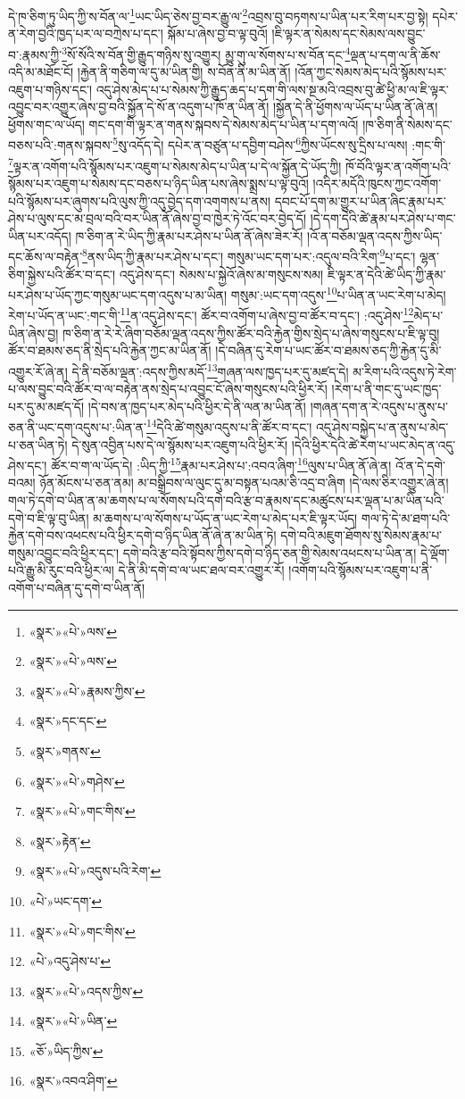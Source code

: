 དེ་ཁ་ཅིག་ཏུ་ཡིད་ཀྱི་ས་བོན་ལ་\footnote{«སྣར་»«པེ་»ལས་}ཡང་ཡིད་ཅེས་བྱ་བར་རྒྱུ་ལ་\footnote{«སྣར་»«པེ་»ལས་}འབྲས་བུ་བཏགས་པ་ཡིན་པར་རིག་པར་བྱ་སྟེ། དཔེར་ན་རེག་བྱའི་ཁྱད་པར་ལ་བཀྲེས་པ་དང་། སྐོམ་པ་ཞེས་བྱ་བ་ལྟ་བུའོ། །ཇི་ལྟར་ན་སེམས་དང་སེམས་ལས་བྱུང་བ་:རྣམས་ཀྱི་\footnote{«སྣར་»«པེ་»རྣམས་ཀྱིས་}སོ་སོའི་ས་བོན་གྱི་རྒྱུད་གཉིས་སུ་འགྱུར། མྱུ་གུ་ལ་སོགས་པ་ས་བོན་དང་\footnote{«སྣར་»དང་དང་}ལྡན་པ་དག་ལ་ནི་ཆོས་འདི་མ་མཐོང་ངོ། །རྐྱེན་ནི་གཅིག་ལ་དུ་མ་ཡིན་གྱི། ས་བོན་ནི་མ་ཡིན་ནོ། །འོན་ཀྱང་སེམས་མེད་པའི་སྙོམས་པར་འཇུག་པ་གཉིས་དང་། འདུ་ཤེས་མེད་པ་པ་སེམས་ཀྱི་རྒྱུད་ཆད་པ་དག་གི་ལས་སྔ་མའི་འབྲས་བུ་ཚེ་ཕྱི་མ་ལ་ཇི་ལྟར་འབྱུང་བར་འགྱུར་ཞེས་བྱ་བའི་སྐྱོན་དེ་སོ་ན་འདུག་པ་ཁོ་ན་ཡིན་ནོ། །སྐྱོན་དེ་ནི་ཕྱོགས་ལ་ཡོད་པ་ཡིན་ནོ་ཞེ་ན། ཕྱོགས་གང་ལ་ཡོད། གང་དག་གི་ལྟར་ན་གནས་སྐབས་དེ་སེམས་མེད་པ་ཡིན་པ་དག་ལའོ། །ཁ་ཅིག་ནི་སེམས་དང་བཅས་པའི་:གནས་སྐབས་\footnote{«སྣར་»གནས་}སུ་འདོད་དེ། དཔེར་ན་བཙུན་པ་དབྱིག་བཤེས་\footnote{«སྣར་»«པེ་»གཤེས་}ཀྱིས་ཡོངས་སུ་དྲིས་པ་ལས། :གང་གི་\footnote{«སྣར་»«པེ་»གང་གིས་}ལྟར་ན་འགོག་པའི་སྙོམས་པར་འཇུག་པ་སེམས་མེད་པ་ཡིན་པ་དེ་ལ་སྐྱོན་དེ་ཡོད་ཀྱི། ཁོ་བོའི་ལྟར་ན་འགོག་པའི་སྙོམས་པར་འཇུག་པ་སེམས་དང་བཅས་པ་ཉིད་ཡིན་པས་ཞེས་སྨྲས་པ་ལྟ་བུའོ། །འདིར་མདོའི་ཁུངས་ཀྱང་འགོག་པའི་སྙོམས་པར་ཞུགས་པའི་ལུས་ཀྱི་འདུ་བྱེད་དག་འགགས་པ་ནས། དབང་པོ་དག་མ་གྱུར་པ་ཡིན་ཞིང་རྣམ་པར་ཤེས་པ་ལུས་དང་མ་བྲལ་བའི་བར་ཡིན་ནོ་ཞེས་བྱ་བ་ཁྱེར་ཏེ་འོང་བར་བྱེད་དོ། །དེ་དག་དེའི་ཚེ་རྣམ་པར་ཤེས་པ་གང་ཡིན་པར་འདོད། ཁ་ཅིག་ན་རེ་ཡིད་ཀྱི་རྣམ་པར་ཤེས་པ་ཡིན་ནོ་ཞེས་ཟེར་རོ། །འོ་ན་བཅོམ་ལྡན་འདས་ཀྱིས་ཡིད་དང་ཆོས་ལ་བརྟེན་\footnote{«སྣར་»རྟེན་}ནས་ཡིད་ཀྱི་རྣམ་པར་ཤེས་པ་དང་། གསུམ་ཡང་དག་པར་:འདུལ་བའི་རིག་\footnote{«སྣར་»«པེ་»འདུས་པའི་རེག་}པ་དང་། ལྷན་ཅིག་སྐྱེས་པའི་ཚོར་བ་དང་། འདུ་ཤེས་དང་། སེམས་པ་སྐྱེའོ་ཞེས་མ་གསུངས་སམ། ཇི་ལྟར་ན་དེའི་ཚེ་ཡིད་ཀྱི་རྣམ་པར་ཤེས་པ་ཡོད་ཀྱང་གསུམ་ཡང་དག་འདུས་པ་མ་ཡིན། གསུམ་:ཡང་དག་འདུས་\footnote{«པེ་»ཡང་དག་}པ་ཡིན་ན་ཡང་རེག་པ་མེད། རེག་པ་ཡོད་ན་ཡང་:གང་གི་\footnote{«སྣར་»«པེ་»གང་གིས་}ན་འདུ་ཤེས་དང་། ཚོར་བ་འགོག་པ་ཞེས་བྱ་བ་ཚོར་བ་དང་། :འདུ་ཤེས་\footnote{«པེ་»འདུ་ཤེས་པ་}མེད་པ་ཡིན་ཞེས་བྱ། ཁ་ཅིག་ན་རེ་རེ་ཞིག་བཅོམ་ལྡན་འདས་ཀྱིས་ཚོར་བའི་རྐྱེན་གྱིས་སྲེད་པ་ཞེས་གསུངས་པ་ཇི་ལྟ་བུ། ཚོར་བ་ཐམས་ཅད་ནི་སྲེད་པའི་རྐྱེན་ཀྱང་མ་ཡིན་ནོ། །དེ་བཞིན་དུ་རེག་པ་ཡང་ཚོར་བ་ཐམས་ཅད་ཀྱི་རྐྱེན་དུ་མི་འགྱུར་རོ་ཞེ་ན། དེ་ནི་བཅོམ་ལྡན་:འདས་ཀྱིས་མདོ་\footnote{«སྣར་»«པེ་»འདས་ཀྱིས་}གཞན་ལས་ཁྱད་པར་དུ་མཛད་དེ། མ་རིག་པའི་འདུས་ཏེ་རེག་པ་ལས་བྱུང་བའི་ཚོར་བ་ལ་བརྟེན་ནས་སྲེད་པ་འབྱུང་ངོ་ཞེས་གསུངས་པའི་ཕྱིར་རོ། །རེག་པ་ནི་གང་དུ་ཡང་ཁྱད་པར་དུ་མ་མཛད་དོ། །དེ་བས་ན་ཁྱད་པར་མེད་པའི་ཕྱིར་དེ་ནི་ལན་མ་ཡིན་ནོ། །གཞན་དག་ན་རེ་འདུས་པ་ནུས་པ་ཅན་ནི་ཡང་དག་འདུས་པ་:ཡིན་ན་\footnote{«སྣར་»«པེ་»ཡིན་}དེའི་ཚེ་གསུམ་འདུས་པ་ནི་ཚོར་བ་དང་། འདུ་ཤེས་བསྐྱེད་པ་ན་ནུས་པ་མེད་པ་ཅན་ཡིན་ཏེ། དེ་སུན་འབྱིན་པས་དེ་ལ་སྙོམས་པར་འཇུག་པའི་ཕྱིར་རོ། །དེའི་ཕྱིར་དེའི་ཚེ་རེག་པ་ཡང་མེད་ན་འདུ་ཤེས་དང་། ཚོར་བ་ག་ལ་ཡོད་དེ། :ཡིད་ཀྱི་\footnote{«ཅོ་»ཡིད་ཀྱིས་}རྣམ་པར་ཤེས་པ་:འབའ་ཞིག་\footnote{«སྣར་»འབའ་ཤིག་}ལུས་པ་ཡིན་ནོ་ཞེ་ན། འོ་ན་དེ་དགེ་བའམ། ཉོན་མོངས་པ་ཅན་ནམ། མ་བསྒྲིབས་ལ་ལུང་དུ་མ་བསྟན་པའམ་ཅི་འདྲ་བ་ཞིག །དེ་ལས་ཅིར་འགྱུར་ཞེ་ན། གལ་ཏེ་དགེ་བ་ཡིན་ན་མ་ཆགས་པ་ལ་སོགས་པའི་དགེ་བའི་རྩ་བ་རྣམས་དང་མཚུངས་པར་ལྡན་པ་མ་ཡིན་པའི་དགེ་བ་ཇི་ལྟ་བུ་ཡིན། མ་ཆགས་པ་ལ་སོགས་པ་ཡོད་ན་ཡང་རེག་པ་མེད་པར་ཇི་ལྟར་ཡོད། གལ་ཏེ་དེ་མ་ཐག་པའི་རྐྱེན་དགེ་བས་འཕངས་པའི་ཕྱིར་དགེ་བ་ཉིད་ཡིན་ནོ་ཞེ་ན་མ་ཡིན་ཏེ། དགེ་བའི་མཇུག་ཐོགས་སུ་སེམས་རྣམ་པ་གསུམ་འབྱུང་བའི་ཕྱིར་དང་། དགེ་བའི་རྩ་བའི་སྟོབས་ཀྱིས་དགེ་བ་ཉིད་ཅན་གྱི་སེམས་འཕངས་པ་ཡིན་ན། དེ་ལྡོག་པའི་རྒྱུ་མི་རུང་བའི་ཕྱིར་ལ། དེ་ནི་མི་དགེ་བ་ལ་ཡང་ཐལ་བར་འགྱུར་རོ། །འགོག་པའི་སྙོམས་པར་འཇུག་པ་ནི་འགོག་པ་བཞིན་དུ་དགེ་བ་ཡིན་ནོ། 